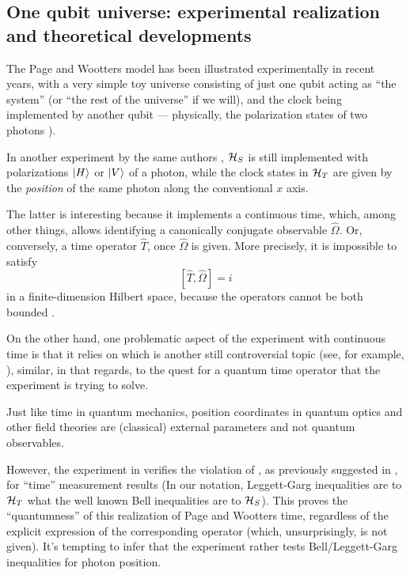 \subsection{One qubit universe: experimental realization and theoretical developments}
\label{sec:pw:qubit}

The Page and Wootters model has been illustrated experimentally in recent years,
with a very simple toy universe consisting of just one qubit acting as ``the system'' (or
``the rest of the universe'' if we will), and the clock being implemented by another qubit ---
physically, the polarization states of two photons \parencite{Moreva:synthetic,Moreva:illustration}).

In another experiment by the same authors \parencite{Moreva_position}, $\mathcal{H}_S$ is still implemented with 
polarizations $\ket{H}$ or $\ket{V}$ of a photon, while the clock states in $\mathcal{H}_T$
are given by the \emph{position} of the same photon along the conventional $x$ axis.

The latter is interesting because it implements a continuous time,
which, among other things, allows identifying a canonically conjugate observable
$\hat{\Omega}$. Or, conversely, a time operator $\hat{T}$, once $\hat{\Omega}$ is given.
More precisely, it is impossible to satisfy
\begin{equation}\label{eq:canonical_commutation_in_time}
  [\hat{T}, \hat{\Omega}] = i
\end{equation}
in a finite-dimension Hilbert space, because the operators
cannot be both bounded \parencite{Weyl1927}.

On the other hand, one problematic aspect of the experiment with continuous time
is that
it relies on  which is another
still controversial topic (see, for example, \cite{HawtonPhotonPosition}),
similar, in that regards, to the quest for a quantum time operator that the experiment is trying to solve.

Just like time in quantum mechanics, position coordinates in quantum optics and other field theories
are (classical) external parameters and not quantum observables. 

However, the experiment in \cite{Moreva_position} verifies the violation of
, as previously suggested in \cite{LeggettGarg+PageWootters},
for ``time'' measurement results
(In our notation, Leggett-Garg inequalities are to $\mathcal{H}_T$ what the well known Bell inequalities
  are to $\mathcal{H}_S$).
This proves the ``quantumness'' of this realization of Page and Wootters time,
regardless of the explicit expression of the corresponding operator (which, unsurprisingly,
is not given). It's tempting to infer that the experiment
rather tests Bell/Leggett-Garg inequalities for photon position.

